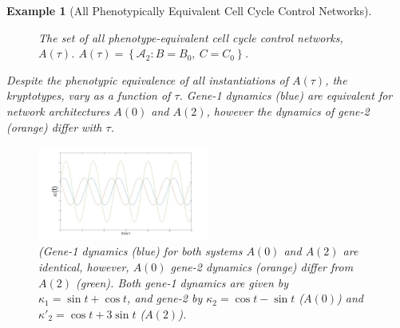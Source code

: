 \documentclass{article}
\newcommand{\calA}{\mathcal{A}}
\newcommand{\1}{\mathbbm{1}}
\newtheorem{example}{Example}
\begin{document}
\begin{example}[All Phenotypically Equivalent Cell Cycle Control Networks]
\begin{figure}[H]
    \caption{The set of all phenotype-equivalent cell cycle control networks, $A(\tau)$.
      $A(\tau) = \left\{ \calA_2 : B = B_0,\ C = C_0\right\}$.}
    \end{figure}

   Despite the phenotypic equivalence of all instantiations of $A(\tau)$, the kryptotypes, vary as a function of $\tau$. 
    Gene-1 dynamics (blue) are equivalent for network architectures $A(0)$ and $A(2)$, however the dynamics of gene-2 (orange) differ with $\tau$.
  \begin{figure}[H]
    \centering
    \includegraphics[width=0.5\textwidth, height=0.125\paperheight]{figures/osc_kryp_compare}
    \caption{(Gene-1 dynamics (blue) for both systems $A(0)$ and $A(2)$ are identical, however, $A(0)$ gene-2 dynamics (orange) differ from $A(2)$ (green). Both gene-1 dynamics are given by $\kappa_{1} = \sin t + \cos t$, and gene-2 by $\kappa_{2} = \cos t - \sin t$ ($A(0)$) and $\kappa'_{2} = \cos t + 3 \sin t$ ($A(2)$).}
  \end{figure}
\end{example}
\end{document}

